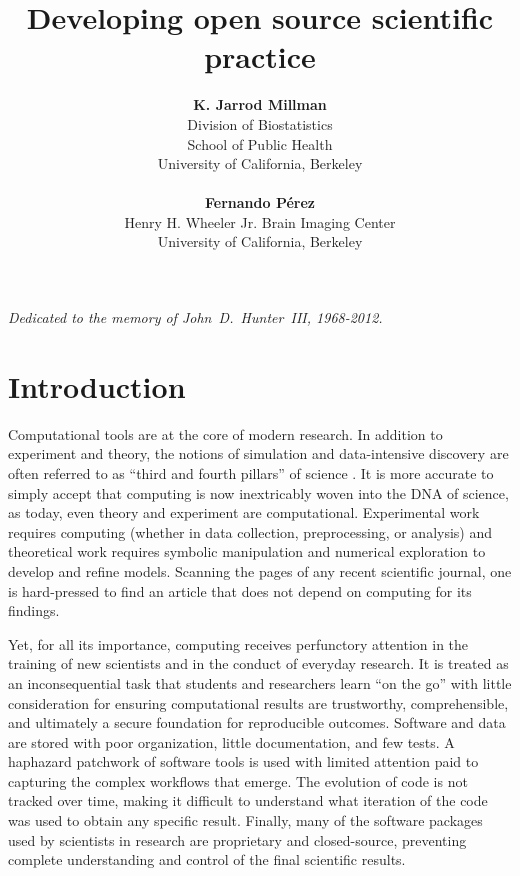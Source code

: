 \documentclass[11pt,oneside,english]{article}
\begin{document}
\title{Developing open source scientific practice}


\author{\textbf{K. Jarrod Millman} \\
Division of Biostatistics\\
School of Public Health\\
University of California, Berkeley
\\\vspace*{1mm}\\
\textbf{Fernando Pérez}\\
Henry H. Wheeler Jr. Brain Imaging Center\\
University of California, Berkeley}


\maketitle


\begin{flushright}
\emph{Dedicated to the memory of John~D.~Hunter~III, 1968-2012.}
\end{flushright} 

\tableofcontents

\section{Introduction}\label{intro}

Computational tools are at the core of modern research. In addition to
experiment and theory, the notions of simulation and data-intensive discovery
are often referred to as ``third and fourth pillars'' of science
\cite{4th-paradigm}.  It is more accurate to simply accept that
computing is now inextricably woven into the DNA of science, as today, even
theory and experiment are computational.  Experimental work requires computing
(whether in data collection, preprocessing, or analysis) and theoretical work
requires symbolic manipulation and numerical exploration to develop and refine
models. Scanning the pages of any recent scientific journal, one is
hard-pressed to find an article that does not depend on computing for its
findings.

Yet, for all its importance, computing receives perfunctory attention in the
training of new scientists and in the conduct of everyday research.  It is
treated as an inconsequential task that students and researchers learn ``on the
go'' with little consideration for ensuring computational results are
trustworthy, comprehensible, and ultimately a secure foundation for
reproducible outcomes.  Software and data are stored with poor organization,
little documentation, and few tests.  A haphazard patchwork of software tools
is used with limited attention paid to capturing the complex workflows that
emerge.  The evolution of code is not tracked over time, making it difficult to
understand what iteration of the code was used to obtain any specific result.
Finally, many of the software packages used by scientists in research are
proprietary and closed-source, preventing complete understanding and control of
the final scientific results.
\end{document}
